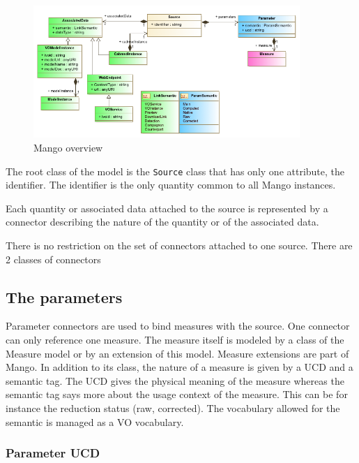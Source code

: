 \documentclass[11pt,a4paper]{ivoa}
\begin{document}
\begin{figure}
\includegraphics[width=0.9\textwidth]{../model/overview_diagram.png}
\caption{Mango overview}
\label{fig:overview}
\end{figure}

The root class of the model is the \texttt{Source} class that has only one attribute, the identifier. The identifier is the only quantity common to  all  Mango instances.

Each quantity or associated data attached to the source is represented by a connector describing the nature of the quantity or of the associated data.

There is no restriction on the set of connectors attached to one source.
There are 2 classes of connectors

\subsection{The parameters} 
Parameter connectors are used to bind measures with the source. One connector can only reference one measure. The measure itself is modeled by a class of the Measure model or by an extension of this model. Measure extensions are part of Mango. 
In addition to its class, the nature of a measure is given by a UCD and a semantic tag. The UCD gives the physical meaning of the measure whereas the semantic tag says more about the usage context of the measure. This can be for instance the reduction status (raw, corrected). The vocabulary allowed for the semantic is managed as a VO vocabulary. 

\subsubsection{Parameter UCD}
\end{document}
